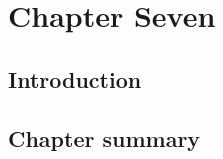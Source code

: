 %
%
\chapter{Chapter Seven} \label{chap:seven}

\section{Introduction} \label{sec:intro}


\section{Chapter summary}

